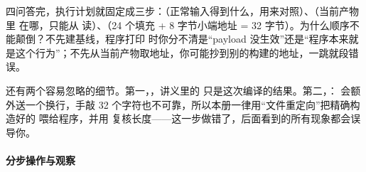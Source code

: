 \documentclass[UTF8,12pt,oneside]{ctexbook}
\begin{document}
四问答完，执行计划就固定成三步：（正常输入得到什么，用来对照）、（当前产物里  在哪，只能从  读）、（24 个填充 + 8 字节小端地址 = 32 字节）。为什么顺序不能颠倒？不先建基线，程序打印  时你分不清是“payload 没生效”还是“程序本来就是这个行为”；不先从当前产物取地址，你可能抄到别的构建的地址，一跳就段错误。

还有两个容易忽略的细节。第一，，讲义里的  只是这次编译的结果。第二，： 会额外送一个换行，手敲 32 个字符也不可靠，所以本册一律用“文件重定向”把精确构造好的  喂给程序，并用  复核长度——这一步做错了，后面看到的所有现象都会误导你。

\paragraph{分步操作与观察}
\end{document}
